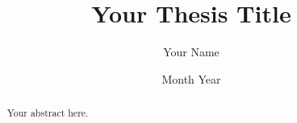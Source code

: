 \documentclass{sapthesis} %
\begin{document}
\title{Your Thesis Title}
\author{Your Name}
\date{Month Year}
\maketitle

\begin{abstract}
Your abstract here.
\end{abstract}

\tableofcontents


%

\end{document}
